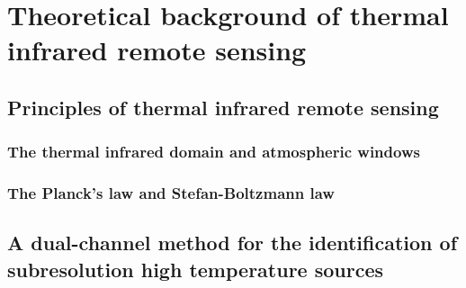 \chapter{Theoretical background of thermal infrared remote sensing}

\label{Chapter2}




\section{Principles of thermal infrared remote sensing}


\subsection{The thermal infrared  domain and atmospheric windows}


\subsection{The Planck's law and Stefan-Boltzmann law}


\section{A dual-channel method for the identification of subresolution high temperature sources}


